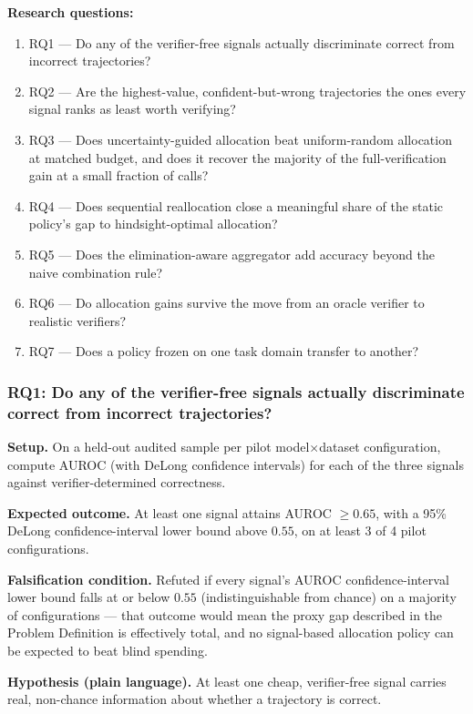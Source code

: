 \documentclass[11pt]{article}
\begin{document}
\textbf{Research questions:}
\begin{enumerate}[leftmargin=1.6em]
\item RQ1 --- Do any of the verifier-free signals actually discriminate correct from incorrect trajectories?
\item RQ2 --- Are the highest-value, confident-but-wrong trajectories the ones every signal ranks as least worth verifying?
\item RQ3 --- Does uncertainty-guided allocation beat uniform-random allocation at matched budget, and does it recover the majority of the full-verification gain at a small fraction of calls?
\item RQ4 --- Does sequential reallocation close a meaningful share of the static policy's gap to hindsight-optimal allocation?
\item RQ5 --- Does the elimination-aware aggregator add accuracy beyond the naive combination rule?
\item RQ6 --- Do allocation gains survive the move from an oracle verifier to realistic verifiers?
\item RQ7 --- Does a policy frozen on one task domain transfer to another?
\end{enumerate}

\subsubsection{RQ1: Do any of the verifier-free signals actually discriminate correct from incorrect trajectories?}
\textbf{Setup.} On a held-out audited sample per pilot model$\times$dataset configuration, compute AUROC (with DeLong confidence intervals) for each of the three signals against verifier-determined correctness.

\textbf{Expected outcome.} At least one signal attains AUROC $\geq 0.65$, with a 95\% DeLong confidence-interval lower bound above $0.55$, on at least 3 of 4 pilot configurations.

\textbf{Falsification condition.} Refuted if every signal's AUROC confidence-interval lower bound falls at or below $0.55$ (indistinguishable from chance) on a majority of configurations --- that outcome would mean the proxy gap described in the Problem Definition is effectively total, and no signal-based allocation policy can be expected to beat blind spending.

\textbf{Hypothesis (plain language).} At least one cheap, verifier-free signal carries real, non-chance information about whether a trajectory is correct.
\end{document}
